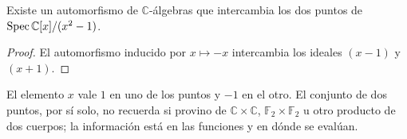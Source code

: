 \begin{prop}
\label{prop:s01-dos-puntos-no-son-intrinsecamente}
Existe un automorfismo de $\mathbb C$-álgebras que intercambia los dos puntos de $\operatorname{Spec}\mathbb C[x]/(x^2-1)$.
\end{prop}
\begin{proof}
El automorfismo inducido por $x\mapsto -x$ intercambia los ideales $(x-1)$ y $(x+1)$.
\end{proof}

\begin{obs}
\label{obs:s01-queria-decir}
El elemento $x$ vale $1$ en uno de los puntos y $-1$ en el otro. El conjunto de dos puntos, por sí solo, no recuerda si provino de $\mathbb C\times\mathbb C$, $\mathbb F_2\times\mathbb F_2$ u otro producto de dos cuerpos; la información está en las funciones y en dónde se evalúan.
\end{obs}

